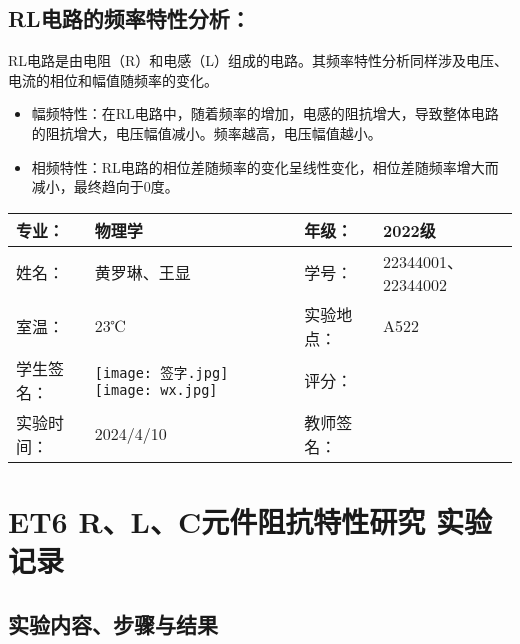 \documentclass[dvipsnames, svgnames,a4paper,11pt]{article}
\begin{document}
\subsection*{RL电路的频率特性分析：}
RL电路是由电阻（R）和电感（L）组成的电路。其频率特性分析同样涉及电压、电流的相位和幅值随频率的变化。
\begin{itemize}
  \item 幅频特性：在RL电路中，随着频率的增加，电感的阻抗增大，导致整体电路的阻抗增大，电压幅值减小。频率越高，电压幅值越小。
  \item 相频特性：RL电路的相位差随频率的变化呈线性变化，相位差随频率增大而减小，最终趋向于0度。
\end{itemize}
	
	
	
	\clearpage
	
	\begin{table}
		\renewcommand\arraystretch{1.7}
		\centering
		\begin{tabularx}{\textwidth}{|X|X|X|X|}
			\hline
			专业： & 物理学 & 年级： & 2022级 \\
			\hline
			姓名： &黄罗琳、王显  & 学号： &22344001、22344002 \\
			\hline
			室温： &23℃  & 实验地点： & A522 \\
			\hline
			学生签名：&\texttt{[image: 签字.jpg]} \texttt{[image: wx.jpg]}   & 评分： &\\
			\hline
			实验时间：& 2024/4/10 & 教师签名：&\\
			\hline
		\end{tabularx}
	\end{table}
	
	\section{ET6 R、L、C元件阻抗特性研究 \quad\heiti 实验记录}
	
	\subsection{实验内容、步骤与结果}
	
\end{document}
